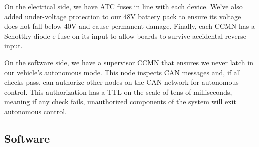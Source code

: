 On the electrical side, we have ATC fuses in line with each device.
We've also added under-voltage protection to our 48V battery pack to
ensure its voltage does not fall below 40V and cause permanent damage.
Finally, each CCMN has a Schottky diode e-fuse on its input to allow
boards to survive accidental reverse input.

On the software side, we have a supervisor CCMN that ensures we never
latch in our vehicle's autonomous mode. This node inspects CAN messages
and, if all checks pass, can authorize other nodes on the CAN network
for autonomous control. This authorization has a TTL on the scale of
tens of milliseconds, meaning if any check fails, unauthorized
components of the system will exit autonomous control.

\subsection{Software}
